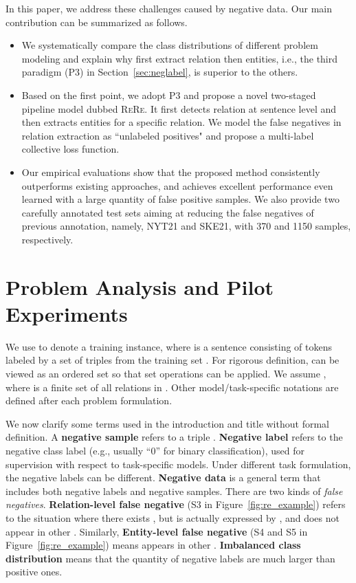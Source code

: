 \documentclass[11pt,a4paper]{article}
\begin{document}
In this paper, we address these challenges caused by negative data. Our main contribution can be summarized as follows. 
\begin{itemize}
    \item We systematically compare the class distributions of different problem modeling and explain why first extract relation then entities, i.e., the third paradigm (P3) in Section~\ref{sec:neglabel},  is superior to the others.
    \item Based on the first point, we adopt P3 and propose a novel two-staged pipeline model dubbed \textsc{ReRe}. 
    It first detects relation at sentence level and then extracts entities for a specific relation.
    We model the false negatives in relation extraction as ``unlabeled positives" and propose a multi-label collective loss function.
    \item Our empirical evaluations show that the proposed method consistently outperforms existing approaches, and achieves excellent performance even learned with a large quantity of false positive samples. 
    We also provide two carefully annotated test sets aiming at reducing the false negatives of previous annotation, namely, NYT21 and SKE21, with 370 and 1150 samples, respectively.
\end{itemize}




\section{Problem Analysis and Pilot Experiments}

We use  to denote a training instance, where  is a sentence consisting of  tokens  labeled by a set of triples  from the training set .
For rigorous definition,  can be viewed as an ordered set  so that set operations can be applied.
We assume , where  is a finite set of all relations in . 
Other model/task-specific notations are defined after each problem formulation.

We now clarify some terms used in the introduction and title without formal definition.
A \textbf{negative sample} refers to a triple  .
\textbf{Negative label} refers to the negative class label (e.g., usually ``0'' for binary classification), used for supervision with respect to task-specific models. Under different task formulation, the negative labels can be different.
\textbf{Negative data} is a general term that includes both negative labels and negative samples.
There are two kinds of \textit{false negatives}.
\textbf{Relation-level false negative} (S3 in Figure~\ref{fig:re_example}) refers to the situation where there exists , but  is actually expressed by , and does not appear in other .
Similarly, \textbf{Entity-level false negative} (S4 and S5 in Figure~\ref{fig:re_example}) means  appears in other .
\textbf{Imbalanced class distribution} means that the quantity of negative labels are much larger than positive ones.
\end{document}

